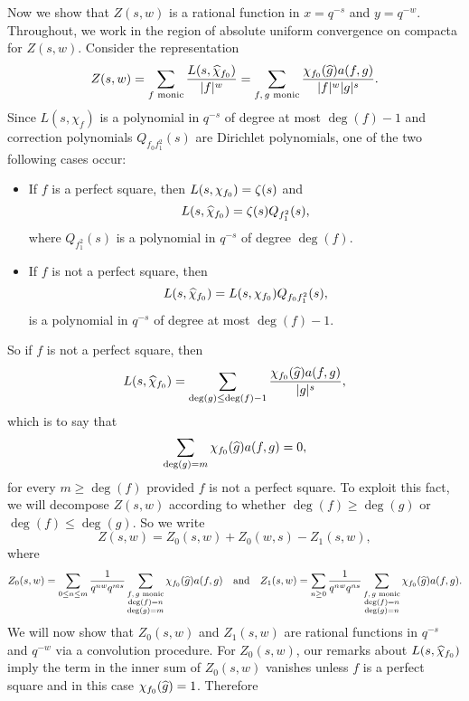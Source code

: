 \documentclass[12pt,reqno,oneside]{amsart}
\begin{document}
    Now we show that $Z(s,w)$ is a rational function in $x = q^{-s}$ and $y = q^{-w}$. Throughout, we work in the region of absolute uniform convergence on compacta for $Z(s,w)$. Consider the representation
    \[
        Z(s,w) = \sum_{\text{$f$ monic}}\frac{L(s,\widehat{\chi}_{f_{0}})}{|f|^{w}} = \sum_{\text{$f,g$ monic}}\frac{\chi_{f_{0}}(\widehat{g})a(f,g)}{|f|^{w}|g|^{s}}.
    \]
    Since $L(s,\chi_{f})$ is a polynomial in $q^{-s}$ of degree at most $\deg(f)-1$ and correction polynomials $Q_{f_{0}f_{1}^{2}}(s)$ are Dirichlet polynomials, one of the two following cases occur:
    \begin{itemize}
        \item If $f$ is a perfect square, then $L(s,\chi_{f_{0}}) = \zeta(s)$ and
        \[
            L(s,\widehat{\chi}_{f_{0}}) = \zeta(s)Q_{f_{1}^{2}}(s),
        \]
        where $Q_{f_{1}^{2}}(s)$ is a polynomial in $q^{-s}$ of degree $\deg(f)$.
        \item If $f$ is not a perfect square, then
        \[
            L(s,\widehat{\chi}_{f_{0}}) = L(s,\chi_{f_{0}})Q_{f_{0}f_{1}^{2}}(s),
        \]
        is a polynomial in $q^{-s}$ of degree at most $\deg(f)-1$.
    \end{itemize}
    So if $f$ is not a perfect square, then
    \[
        L(s,\widehat{\chi}_{f_{0}}) = \sum_{\deg(g) \le \deg(f)-1}\frac{\chi_{f_{0}}(\widehat{g})a(f,g)}{|g|^{s}},
    \]
    which is to say that
    \[
        \sum_{\deg(g) = m}\chi_{f_{0}}(\widehat{g})a(f,g) = 0,
    \]
    for every $m \ge \deg(f)$ provided $f$ is not a perfect square. To exploit this fact, we will decompose $Z(s,w)$ according to whether $\deg(f) \ge \deg(g)$ or $\deg(f) \le \deg(g)$. So we write
    \[
        Z(s,w) = Z_{0}(s,w)+Z_{0}(w,s)-Z_{1}(s,w),
    \]
    where
    \[
        Z_{0}(s,w) = \sum_{0 \le n \le m}\frac{1}{q^{nw}q^{ms}}\sum_{\substack{\text{$f,g$ monic} \\ \deg(f) = n \\ \deg(g) = m}}\chi_{f_{0}}(\widehat{g})a(f,g) \quad \text{and} \quad Z_{1}(s,w) = \sum_{n \ge 0}\frac{1}{q^{nw}q^{ns}}\sum_{\substack{\text{$f,g$ monic} \\ \deg(f) = n \\ \deg(g) = n}}\chi_{f_{0}}(\widehat{g})a(f,g).
    \]
    We will now show that $Z_{0}(s,w)$ and $Z_{1}(s,w)$ are rational functions in $q^{-s}$ and $q^{-w}$ via a convolution procedure. For $Z_{0}(s,w)$, our remarks about $L(s,\widehat{\chi}_{f_{0}})$ imply the term in the inner sum of $Z_{0}(s,w)$ vanishes unless $f$ is a perfect square and in this case $\chi_{f_{0}}(\widehat{g}) = 1$. Therefore
\end{document}

